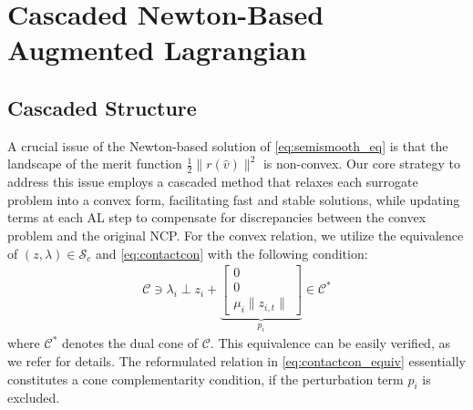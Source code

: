 \documentclass[lettersize,journal]{IEEEtran}
\begin{document}
\section{Cascaded Newton-Based Augmented Lagrangian} \label{sec:canal}

\subsection{Cascaded Structure}

A crucial issue of the Newton-based solution of \eqref{eq:semismooth_eq} is that the landscape of the merit function $\frac{1}{2}\| r(\hat{v})\|^2$ is non-convex.
Our core strategy to address this issue employs a cascaded method that relaxes each surrogate problem into a convex form, facilitating fast and stable solutions, while updating terms at each AL step to compensate for discrepancies between the convex problem and the original NCP.
For the convex relation, we utilize the equivalence of $(z,\lambda) \in \mathcal{S}_c$ and \eqref{eq:contactcon} with the following condition:
\begin{align} \label{eq:contactcon_equiv}
    \mathcal{C} \ni \lambda_i \perp z_i + \underbrace{\begin{bmatrix}
     0 \\ 0 \\ \mu_i \| z_{i,t} \|   
    \end{bmatrix}}_{p_i} \in \mathcal{C}^* 
\end{align}
where $\mathcal{C}^*$ denotes the dual cone of \(\mathcal{C}\). 
This equivalence can be easily verified, as we refer \cite{acary2011formulation} for details. 
The reformulated relation in \eqref{eq:contactcon_equiv} essentially constitutes a cone complementarity condition, if the perturbation term $p_i$ is excluded.
\end{document}

